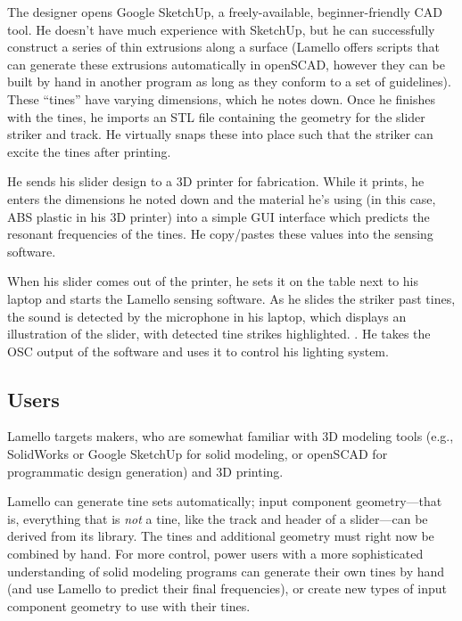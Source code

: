     The designer opens Google SketchUp, a freely-available, beginner-friendly CAD tool. He doesn't have much experience with SketchUp, but he can successfully construct a series of thin extrusions along a surface (Lamello offers scripts that can generate these extrusions automatically in openSCAD, however they can be built by hand in another program as long as they conform to a set of guidelines). These ``tines'' have varying dimensions, which he notes down. Once he finishes with the tines, he imports an STL file containing the geometry for the slider striker and track. He virtually snaps these into place such that the striker can excite the tines after printing.
    
    He sends his slider design to a 3D printer for fabrication. While it prints, he enters the dimensions he noted down and the material he's using (in this case, ABS plastic in his 3D printer) into a simple GUI interface which predicts the resonant frequencies of the tines. He copy/pastes these values into the sensing software.  
    
    When his slider comes out of the printer, he sets it on the table next to his laptop and starts the Lamello sensing software. As he slides the striker past tines, the sound is detected by the microphone in his laptop, which displays an illustration of the slider, with detected tine strikes highlighted. . He takes the OSC output of the software and uses it to control his lighting system.
    

    \subsection{Users}
    
    Lamello targets makers, who are somewhat familiar with 3D modeling tools (e.g., SolidWorks or Google SketchUp for solid modeling, or openSCAD for programmatic design generation) and 3D printing.
    
    Lamello can generate tine sets automatically; input component geometry---that is, everything that is \emph{not} a tine, like the track and header of a slider---can be derived from its library. The tines and additional geometry must right now be combined by hand. For more control, power users with a more sophisticated understanding of solid modeling programs can generate their own tines by hand (and use Lamello to predict their final frequencies), or create new types of input component geometry to use with their tines.
    
